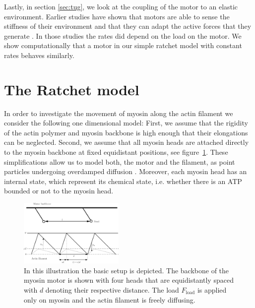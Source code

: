 \documentclass[aps,pre,twocolumn,showpacs,showkeys]{revtex4-1}
\begin{document}
Lastly, in section \ref{sec:tug}, we look at the coupling of the motor to an elastic environment.
Earlier studies have shown that motors are able to sense the stiffness of their environment and that they can adapt the active forces that they generate \cite{stam2015isoforms,albert2014stochastic}.
In those studies the rates did depend on the load on the motor. We show computationally that a motor in our simple ratchet model with constant rates behaves similarly.


\section{The Ratchet model}
\label{sec:ratchet}
In order to investigate the movement of myosin along the actin filament we consider the following one dimensional model:
First, we assume that the rigidity of the actin polymer and myosin backbone is high enough that their elongations can be neglected.
Second, we assume that all myosin heads are attached directly to the myosin backbone at fixed equidistant positions, see figure~\ref{Fig: ratchet setup}. 
These simplifications allow us to model both, the motor and the filament, as point particles undergoing overdamped diffusion \cite{}. %
Moreover, each myosin head has an internal state, which represent its chemical state, 
i.e. whether there is an ATP bounded or not to the myosin head. 
\begin{figure}[t]
\centering
\includegraphics[width=0.45\textwidth,height=!]{ratchet_illustration}
\caption{In this illustration the basic setup is depicted.  
The backbone of the myosin motor is shown with four heads that are equidistantly spaced with $d$ denoting their respective distance. 
The load $F_\text{load}$ is applied only on myosin and the actin filament is freely diffusing. 
} 
\label{Fig: ratchet setup}
\end{figure}
\end{document}
